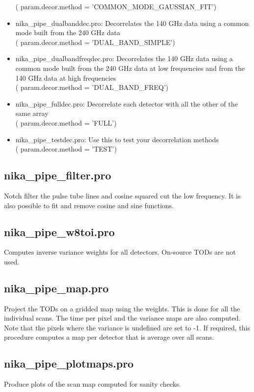\documentclass[a4paper]{article}
\begin{document}
\begin{itemize}
({\color{blue} param.decor.method = 'COMMON\_MODE\_GAUSSIAN\_FIT'})
\item {\color{blue} nika\_pipe\_dualbanddec.pro}: Decorrelates the 140 GHz data using a common mode built from the 240 GHz data\\
 ({\color{blue} param.decor.method = 'DUAL\_BAND\_SIMPLE'})
\item {\color{blue} nika\_pipe\_dualbandfreqdec.pro}: Decorrelates the 140 GHz data using a common mode built from the 240 GHz data at low frequencies and from the 140 GHz data at high frequencies \\
({\color{blue} param.decor.method = 'DUAL\_BAND\_FREQ'})
\item {\color{blue} nika\_pipe\_fulldec.pro}: Decorrelate each detector with all the other of the same array \\
({\color{blue} param.decor.method = 'FULL'})
\item {\color{blue} nika\_pipe\_testdec.pro}: Use this to test your decorrelation methods \\
({\color{blue} param.decor.method = 'TEST'})
\end{itemize}

\subsection{{\color{blue} nika\_pipe\_filter.pro}}
Notch filter the pulse tube lines and cosine squared cut the low frequency. It is also possible to fit and remove cosine and sine functions.

\subsection{{\color{blue} nika\_pipe\_w8toi.pro}}
Computes inverse variance weights for all detectors. On-source TODs are not used.

\subsection{{\color{blue} nika\_pipe\_map.pro}}
Project the TODs on a gridded map using the weights. This is done for all the individual scans. The time per pixel and the variance maps are also computed. Note that the pixels where the variance is undefined are set to -1. If required, this procedure computes a map per detector that is average over all scans.

\subsection{{\color{blue} nika\_pipe\_plotmaps.pro}}
Produce plots of the scan map computed for sanity checks.
\end{document}

